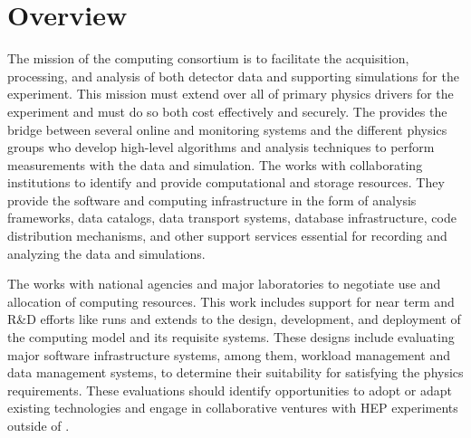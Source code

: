 \section{Overview}
\label{ch:exec-comp-ovr}
The mission of the computing consortium is to facilitate the acquisition, processing, and analysis of both detector data and supporting simulations for the  experiment.  This mission must extend over all of primary physics drivers for the experiment and must do so both cost effectively and securely. The  provides the bridge between several online  and monitoring systems and the different physics groups who develop high-level algorithms and analysis techniques to perform measurements with the  data and simulation. The  works with collaborating institutions to identify and provide computational and storage resources.  They provide the software and computing infrastructure in the form of analysis frameworks, data catalogs, data transport systems, database infrastructure, code distribution mechanisms, and other support services essential for recording and analyzing the data and simulations. 

The  works with national agencies and major laboratories to negotiate use and allocation of computing resources.  This work includes support for near term and R\&D efforts like  runs and extends to the design, development, and deployment of the  computing model and its requisite systems.
These designs include evaluating major software infrastructure systems, among them, workload management and data management systems, to determine their suitability for satisfying the  physics requirements.   These evaluations should identify opportunities to adopt or adapt existing technologies and engage in collaborative ventures with HEP experiments outside of . 

